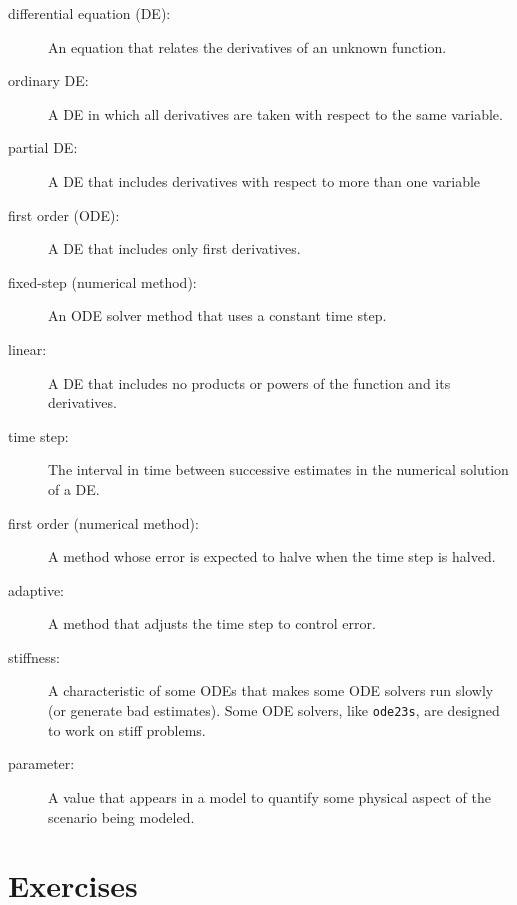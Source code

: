 \documentclass{book}
\begin{document}
\begin{description}

\item[differential equation (DE):] An equation that relates the
derivatives of an unknown function.

\item[ordinary DE:] A DE in which all derivatives are taken with
respect to the same variable.

\item[partial DE:] A DE that includes derivatives with respect to
more than one variable

\item[first order (ODE):] A DE that includes only first derivatives.

\item[fixed-step (numerical method):] An ODE solver method that uses a constant
time step.

\item[linear:] A DE that includes no products or powers of the
function and its derivatives.

\item[time step:] The interval in time between successive estimates
in the numerical solution of a DE.

\item[first order (numerical method):] A method whose error is expected
to halve when the time step is halved.

\item[adaptive:] A method that adjusts the time step to control error.

\item[stiffness:] A characteristic of some ODEs that makes some ODE
solvers run slowly (or generate bad estimates). Some ODE solvers,
like {\tt ode23s}, are designed to work on stiff problems.

\item[parameter:] A value that appears in a model to quantify some
physical aspect of the scenario being modeled.

\end{description}

\section{Exercises}

\newcommand{\degree}{\ensuremath{^\circ}}
\end{document}

